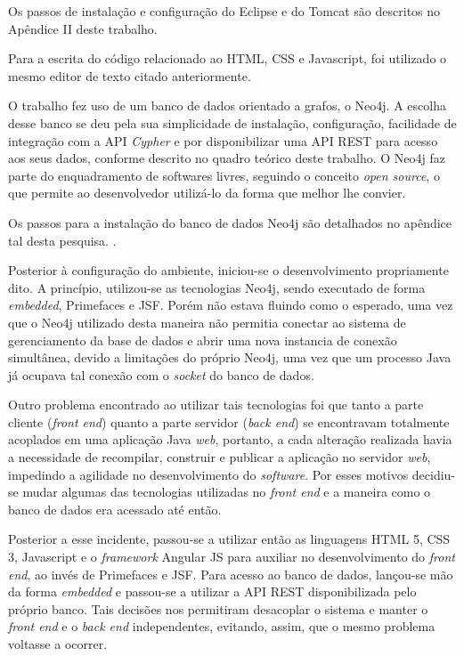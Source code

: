 \par Os passos de instalação e configuração do Eclipse e do Tomcat são descritos no Apêndice II deste trabalho.

\par Para a escrita do código relacionado ao HTML, CSS e Javascript, foi utilizado o mesmo editor de texto citado anteriormente.

\par O trabalho fez uso de um banco de dados orientado a grafos, o Neo4j. A escolha desse banco se deu pela sua simplicidade de instalação, configuração, facilidade de integração com a API \textit{Cypher} e por disponibilizar uma API REST para acesso aos seus dados, conforme descrito no quadro teórico deste trabalho. O Neo4j faz parte do enquadramento de softwares livres, seguindo o conceito \textit{open source}, o que permite ao desenvolvedor utilizá-lo da forma que melhor lhe convier. 


\par Os passos para a instalação do banco de dados Neo4j são detalhados no apêndice tal desta pesquisa. .

 
\newpage

\par Posterior à configuração do ambiente, iniciou-se o desenvolvimento propriamente dito. A princípio, utilizou-se as tecnologias Neo4j, sendo executado de forma \textit{embedded}, Primefaces e JSF. Porém não estava fluindo como o esperado, uma vez que o Neo4j utilizado desta maneira não permitia conectar ao sistema de gerenciamento da base de dados e abrir uma nova instancia de conexão simultânea, devido a limitações do próprio Neo4j, uma vez que um processo Java já ocupava tal conexão com o \textit{socket} do banco de dados.

\par Outro problema encontrado ao utilizar tais tecnologias foi que tanto a parte cliente (\textit{front end}) quanto a parte servidor (\textit{back end}) se encontravam totalmente acoplados em uma aplicação Java \textit{web}, portanto, a cada alteração realizada havia a necessidade de recompilar, construir e publicar a aplicação no servidor \textit{web}, impedindo a agilidade no desenvolvimento do \textit{software}. Por esses motivos decidiu-se mudar algumas das tecnologias utilizadas no \textit{front end} e a maneira como o banco de dados era acessado até então. 

\par Posterior a esse incidente, passou-se a utilizar então as linguagens HTML 5, CSS 3, Javascript e o \textit{framework} Angular JS para auxiliar no desenvolvimento do \textit{front end}, ao invés de Primefaces e JSF. Para acesso ao banco de dados, lançou-se mão da forma \textit{embedded} e passou-se a utilizar a API REST disponibilizada pelo próprio banco. Tais decisões nos permitiram desacoplar o sistema e manter o \textit{front end} e o \textit{back end} independentes, evitando, assim, que o mesmo problema voltasse a ocorrer.

